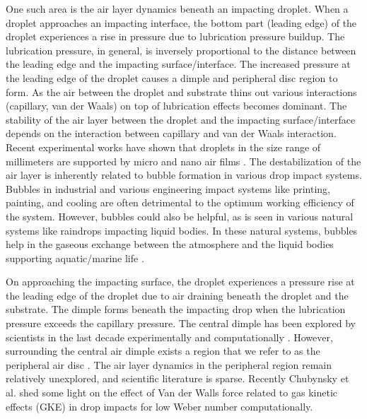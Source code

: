 \documentclass{jfm}
\begin{document}
One such area is the air layer dynamics beneath an impacting droplet. When a droplet approaches an impacting interface, 
 the bottom part (leading edge) of the droplet experiences a rise in pressure due to lubrication pressure buildup. The lubrication pressure, in general, is inversely proportional to the distance between the leading edge and the impacting surface/interface. The increased pressure at the leading edge of the droplet causes a dimple and peripheral disc region to form. As the air between the droplet and substrate thins out various interactions (capillary, van der Waals) on top of lubrication effects becomes dominant. The stability of the air layer between the droplet and the impacting surface/interface depends on the interaction between capillary and van der Waals interaction. Recent experimental works have shown that droplets in the size range of millimeters are supported by micro and nano air films \citep{kolinski2012skating,langley2017impact,langley2019gliding}. The destabilization of the air layer is inherently related to bubble formation in various drop impact systems. Bubbles in industrial and various engineering impact systems like printing, painting, and cooling are often detrimental to the optimum working efficiency of the system. However, bubbles could also be helpful, as is seen in various natural systems like raindrops impacting liquid bodies. In these natural systems, bubbles help in the gaseous exchange between the atmosphere and the liquid bodies supporting aquatic/marine life \citep{woolf2007modelling}.


On approaching the impacting surface, the droplet experiences a pressure rise at the leading edge of the droplet due to air draining beneath the droplet and the substrate. The dimple forms beneath the impacting drop when the lubrication pressure exceeds the capillary pressure.
The central dimple has been explored by scientists in the last decade experimentally and computationally \citep{hicks2010air,hicks2011air,de2012dynamics,de2015wettability,de2019predicting,driscoll2011ultrafast}. 
However, surrounding the central air dimple exists a region that we refer to as the peripheral air disc \citep{roy2022droplet}.
The air layer dynamics in the peripheral region remain relatively unexplored, and scientific literature is sparse. Recently Chubynsky et al. \citep{chubynsky2020bouncing} shed some light on the effect of Van der Walls force related to gas kinetic effects (GKE) in drop impacts for low Weber number computationally. 
\end{document}

